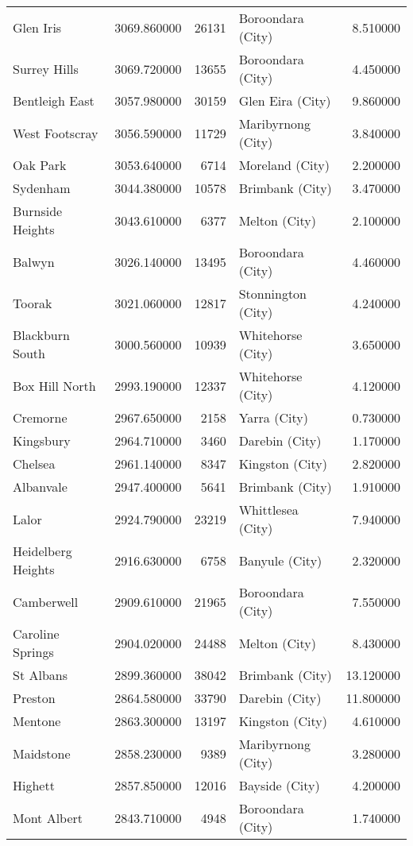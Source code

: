 \begin{longtable}{lrrlr}
Glen Iris & 3069.860000 & 26131 & Boroondara (City) & 8.510000 \\
Surrey Hills & 3069.720000 & 13655 & Boroondara (City) & 4.450000 \\
Bentleigh East & 3057.980000 & 30159 & Glen Eira (City) & 9.860000 \\
West Footscray & 3056.590000 & 11729 & Maribyrnong (City) & 3.840000 \\
Oak Park & 3053.640000 & 6714 & Moreland (City) & 2.200000 \\
Sydenham & 3044.380000 & 10578 & Brimbank (City) & 3.470000 \\
Burnside Heights & 3043.610000 & 6377 & Melton (City) & 2.100000 \\
Balwyn & 3026.140000 & 13495 & Boroondara (City) & 4.460000 \\
Toorak & 3021.060000 & 12817 & Stonnington (City) & 4.240000 \\
Blackburn South & 3000.560000 & 10939 & Whitehorse (City) & 3.650000 \\
Box Hill North & 2993.190000 & 12337 & Whitehorse (City) & 4.120000 \\
Cremorne & 2967.650000 & 2158 & Yarra (City) & 0.730000 \\
Kingsbury & 2964.710000 & 3460 & Darebin (City) & 1.170000 \\
Chelsea & 2961.140000 & 8347 & Kingston (City) & 2.820000 \\
Albanvale & 2947.400000 & 5641 & Brimbank (City) & 1.910000 \\
Lalor & 2924.790000 & 23219 & Whittlesea (City) & 7.940000 \\
Heidelberg Heights & 2916.630000 & 6758 & Banyule (City) & 2.320000 \\
Camberwell & 2909.610000 & 21965 & Boroondara (City) & 7.550000 \\
Caroline Springs & 2904.020000 & 24488 & Melton (City) & 8.430000 \\
St Albans & 2899.360000 & 38042 & Brimbank (City) & 13.120000 \\
Preston & 2864.580000 & 33790 & Darebin (City) & 11.800000 \\
Mentone & 2863.300000 & 13197 & Kingston (City) & 4.610000 \\
Maidstone & 2858.230000 & 9389 & Maribyrnong (City) & 3.280000 \\
Highett & 2857.850000 & 12016 & Bayside (City) & 4.200000 \\
Mont Albert & 2843.710000 & 4948 & Boroondara (City) & 1.740000 \\

\end{longtable}
